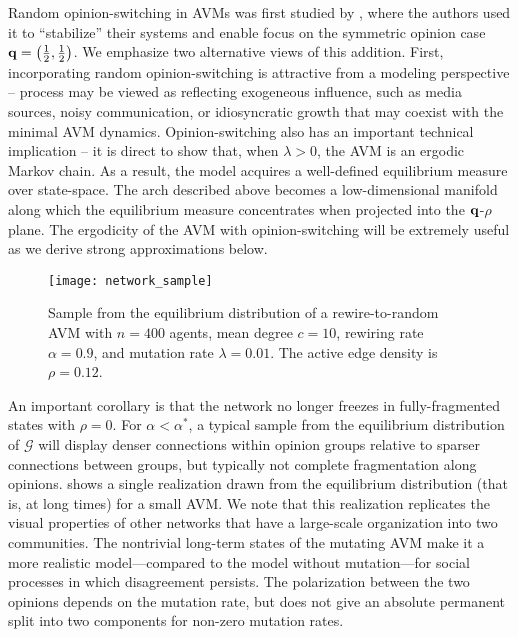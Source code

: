 \documentclass[review, onefignum, onetabnum]{siamart171218}
\begin{document}
	Random opinion-switching in AVMs was first studied by \cite{Ji2013}, where the authors used it to ``stabilize'' their systems and enable focus on the symmetric opinion case $\mathbf{q} = \left(\frac{1}{2}, \frac{1}{2}\right)$. 
	We emphasize two alternative views of this addition. 
	First, incorporating random opinion-switching is attractive from a modeling perspective --  process may be viewed as reflecting exogeneous influence, such as media sources, noisy communication, or idiosyncratic growth that may coexist with the minimal AVM dynamics.  
	Opinion-switching also has an important technical implication -- it is direct to show that, when $\lambda > 0$, the AVM is an ergodic Markov chain. 
	As a result, the model acquires a well-defined equilibrium measure over state-space. 
	The arch described above becomes a low-dimensional manifold along which the equilibrium measure concentrates when projected into the $\mathbf{q}$-$\rho$ plane. 
	The ergodicity of the AVM with opinion-switching will be extremely useful as we derive strong approximations below. 
	
	\begin{figure}
		\centering
		\texttt{[image: network\_sample]}
		\caption{Sample from the equilibrium distribution of a rewire-to-random AVM with $n = 400$ agents, mean degree $c = 10$, rewiring rate $\alpha = 0.9$, and mutation rate $\lambda = 0.01$. The active edge density is $\rho = 0.12$.} \label{fig:sample}
	\end{figure}
	
	An important corollary is that the network no longer freezes in fully-fragmented states with $\rho = 0$. 
	For $\alpha < \alpha^*$, a typical sample from the equilibrium distribution of $\mathcal{G}$ will display denser connections within opinion groups relative to sparser connections between groups, but typically not complete fragmentation along opinions. 
	 shows a single realization drawn from the equilibrium distribution (that is, at long times) for a small AVM. We note that this realization replicates the visual properties of other networks that have a large-scale organization into two communities. 
	The nontrivial long-term states of the mutating AVM make it a more realistic model---compared to the model without mutation---for social processes in which disagreement persists. The polarization between the two opinions depends on the mutation rate, but does not give an absolute permanent split into two components for non-zero mutation rates.
\end{document}
